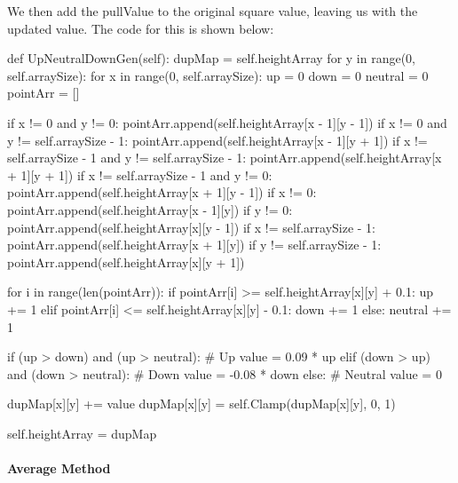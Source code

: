 \begin{flushleft}
            \vspace{0.5cm}

            We then add the pullValue to the original square value, leaving us with the updated value.
            The code for this is shown below:
            \begin{pythoncode}
def UpNeutralDownGen(self):
    dupMap = self.heightArray
    for y in range(0, self.arraySize):
        for x in range(0, self.arraySize):
            up = 0
            down = 0
            neutral = 0
            pointArr = []

            if x != 0 and y != 0:
                pointArr.append(self.heightArray[x - 1][y - 1])
            if x != 0 and y != self.arraySize - 1:
                pointArr.append(self.heightArray[x - 1][y + 1])
            if x != self.arraySize - 1 and y != self.arraySize - 1:
                pointArr.append(self.heightArray[x + 1][y + 1])
            if x != self.arraySize - 1 and y != 0:
                pointArr.append(self.heightArray[x + 1][y - 1])
            if x != 0:
                pointArr.append(self.heightArray[x - 1][y])
            if y != 0:
                pointArr.append(self.heightArray[x][y - 1])
            if x != self.arraySize - 1:
                pointArr.append(self.heightArray[x + 1][y])
            if y != self.arraySize - 1:
                pointArr.append(self.heightArray[x][y + 1])

            for i in range(len(pointArr)):
                if pointArr[i] >= self.heightArray[x][y] + 0.1:
                    up += 1
                elif pointArr[i] <= self.heightArray[x][y] - 0.1:
                    down += 1
                else:
                    neutral += 1

            if (up > down) and (up > neutral): # Up
                value = 0.09 * up
            elif (down > up) and (down > neutral): # Down
                value = -0.08 * down
            else: # Neutral
                value = 0

            dupMap[x][y] += value
            dupMap[x][y] = self.Clamp(dupMap[x][y], 0, 1)

    self.heightArray = dupMap
            \end{pythoncode}

            \paragraph{Average Method} \mbox{} \\
            \vspace{0.25cm}


\end{flushleft}
